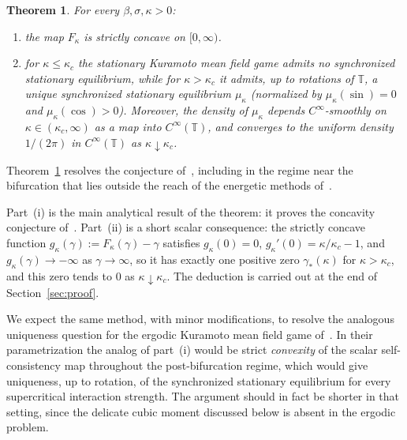 \documentclass{amsart}
\newtheorem{theorem}{Theorem}[section]
\newcommand{\T}{\mathbb T}
\begin{document}
\begin{theorem}\label{thm:main}
For every $\beta,\sigma,\kappa>0$:
\begin{enumerate}
\item[\textup{(i)}] the map $F_\kappa$ is strictly concave on
$[0,\infty)$.
\item[\textup{(ii)}] for $\kappa\leq\kappa_c$ the stationary Kuramoto
mean field game admits no synchronized stationary equilibrium, while
for $\kappa>\kappa_c$ it admits, up to rotations of $\T$, a unique
synchronized stationary equilibrium $\mu_\kappa$ (normalized by
$\mu_\kappa(\sin)=0$ and $\mu_\kappa(\cos)>0$). Moreover, the density
of $\mu_\kappa$ depends $C^\infty$-smoothly on $\kappa\in(\kappa_c,\infty)$
as a map into $C^\infty(\T)$, and converges to the uniform density
$1/(2\pi)$ in $C^\infty(\T)$ as $\kappa\downarrow\kappa_c$.
\end{enumerate}
\end{theorem}

Theorem~\ref{thm:main}
resolves the conjecture of~\cite{CCS}, including in the regime near
the bifurcation that lies outside the reach of the energetic methods
of~\cite{CesaroniCirant}. 

Part~(i) is the main analytical result of the theorem: it proves the
concavity conjecture of~\cite[Rem.~7.4]{CCS}. Part~(ii) is a short
scalar consequence: the strictly concave function
$g_\kappa(\gamma):=F_\kappa(\gamma)-\gamma$ satisfies $g_\kappa(0)=0$,
$g_\kappa'(0)=\kappa/\kappa_c-1$, and $g_\kappa(\gamma)\to-\infty$ as
$\gamma\to\infty$, so it has exactly one positive zero
$\gamma_*(\kappa)$ for $\kappa>\kappa_c$, and this zero tends to $0$
as $\kappa\downarrow\kappa_c$. The deduction is carried out at the
end of Section~\ref{sec:proof}.

We expect the same method, with minor modifications, to
resolve the analogous uniqueness question for the ergodic Kuramoto
mean field game of~\cite{CesaroniCirant}. In their parametrization the
analog of part~(i) would be strict \emph{convexity} of the scalar
self-consistency map throughout the post-bifurcation regime, which
would give uniqueness, up to rotation, of the synchronized stationary
equilibrium for every supercritical interaction strength. The argument
should in fact be shorter in that setting, since the delicate cubic
moment discussed below is absent in the ergodic problem.
\end{document}
